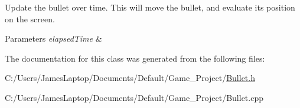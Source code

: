 Update the bullet over time. This will move the bullet, and evaluate its position on the screen. 


\begin{DoxyParams}{Parameters}
{\em elapsed\+Time} & \\
\hline
\end{DoxyParams}


The documentation for this class was generated from the following files\+:\begin{DoxyCompactItemize}
\item 
C\+:/\+Users/\+James\+Laptop/\+Documents/\+Default/\+Game\+\_\+\+Project/\hyperlink{_bullet_8h}{Bullet.\+h}\item 
C\+:/\+Users/\+James\+Laptop/\+Documents/\+Default/\+Game\+\_\+\+Project/Bullet.\+cpp\end{DoxyCompactItemize}
